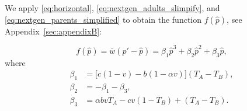 \documentclass[12pt]{extarticle}
\begin{document}
%

We apply \autoref{eq:horizontal}, \autoref{eq:nextgen_adults_slimpify}, and \autoref{eq:nextgen_parents_simplified} to obtain the function $f(\hat{p})$, see Appendix~\autoref{sec:appendixB}:

\begin{equation} \label{eq:general_case_polynomial}
  f(\hat{p}) = \bar{w}(\hat{p}'-\hat{p}) =
  \beta_1 \hat{p}^3 + \beta_2 \hat{p}^2 + \beta_3 \hat{p},
\end{equation}
where 
\begin{equation} \label{eq:polynomial_coefficients}
\begin{aligned}
\beta_1 &= \big[c(1-v) - b (1-\alpha v)\big] (T_A-T_B) , \\
\beta_2 &= -\beta_1 -\beta_3 ,  \\
\beta_3 &= \alpha bvT_A - cv(1-T_B) + (T_A-T_B) .
\end{aligned}
\end{equation}
\end{document}
